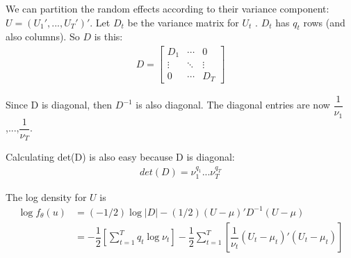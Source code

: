\documentclass{article}
\begin{document}
We can partition the random effects according to their variance component: $U=(U_1',...,U_T')'$.  Let $D_t$ be the variance matrix for $U_t$ . $D_t$ has $q_t$ rows (and also columns). So $D$ is this:
\begin{align}
D = \begin{bmatrix} D_1 & \cdots & 0 \\ \vdots & \ddots & \vdots \\ 0 & \cdots & D_T \end{bmatrix}
\end{align}

Since D is diagonal, then $D^{-1}$ is also diagonal. The diagonal entries are now $\dfrac{1}{\nu_1}$,...,$\dfrac{1}{\nu_T}$.

Calculating det(D) is also easy because D is diagonal:
\begin{align}
det(D)= \nu_1^{q_1}...\nu_T^{q_T}
\end{align}

 The log density for $U$ is
\begin{align}
\log f_\theta(u) &= (-1/2) \log |D| - (1/2) (U-\mu)' D^{-1} (U-\mu)\\
&= -\dfrac{1}{2} \left[  \sum_{t=1}^T q_t \log \nu_t   \right]  -\dfrac{1}{2} \sum_{t=1}^T \left[ \dfrac{1}{\nu_t} (U_t-\mu_t)'(U_t-\mu_t)   \right]
\end{align}
\end{document}
